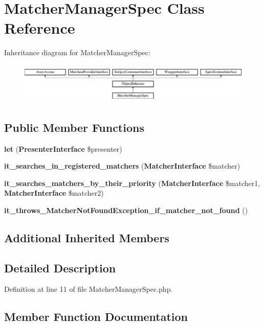 \section{Matcher\+Manager\+Spec Class Reference}
\label{classspec_1_1_php_spec_1_1_runner_1_1_matcher_manager_spec}
Inheritance diagram for Matcher\+Manager\+Spec\+:\begin{figure}[H]
\begin{center}
\leavevmode
\includegraphics[height=1.953488cm]{classspec_1_1_php_spec_1_1_runner_1_1_matcher_manager_spec}
\end{center}
\end{figure}
\subsection*{Public Member Functions}
\begin{DoxyCompactItemize}
\item 
{\bf let} ({\bf Presenter\+Interface} \$presenter)
\item 
{\bf it\+\_\+searches\+\_\+in\+\_\+registered\+\_\+matchers} ({\bf Matcher\+Interface} \$matcher)
\item 
{\bf it\+\_\+searches\+\_\+matchers\+\_\+by\+\_\+their\+\_\+priority} ({\bf Matcher\+Interface} \$matcher1, {\bf Matcher\+Interface} \$matcher2)
\item 
{\bf it\+\_\+throws\+\_\+\+Matcher\+Not\+Found\+Exception\+\_\+if\+\_\+matcher\+\_\+not\+\_\+found} ()
\end{DoxyCompactItemize}
\subsection*{Additional Inherited Members}


\subsection{Detailed Description}


Definition at line 11 of file Matcher\+Manager\+Spec.\+php.



\subsection{Member Function Documentation}
